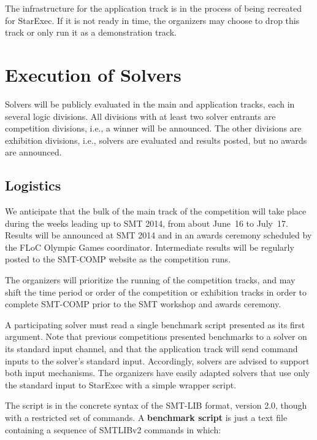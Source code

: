 \documentclass[12pt]{article}
\begin{document}
The infrastructure for the application track is in the process of being recreated for StarExec.
If it is not ready in time, the organizers may choose to drop this track or only run it as a demonstration track.

\section{Execution of Solvers}
\label{sec:exec}

Solvers will be publicly evaluated in the main and application tracks, each in several logic divisions. 
All divisions with at least two solver entrants are competition divisions, i.e., a winner will be announced. The other divisions are exhibition divisions, i.e., solvers are evaluated and results posted, but no awards are announced.

\subsection{Logistics}

%
We anticipate that the bulk of the main track of the competition will take place during
the weeks leading up to SMT 2014, from about June~16 to July~17.  Results will be
announced at SMT 2014 and in an awards ceremony scheduled by the FLoC Olympic Games coordinator.
  Intermediate results
will be regularly posted to the SMT-COMP website as the competition
runs.


The organizers will prioritize the running of the competition tracks, and may shift the
time period or order of the competition or exhibition tracks in order to complete SMT-COMP
prior to the SMT workshop and awards ceremony.

%
A participating solver must read a single benchmark script presented as its first argument.
Note that previous competitions presented benchmarks to a solver on its standard input
channel, and that the application track will send command inputs to the solver's standard input.
Accordingly, solvers are advised to support both input mechanisms. The organizers have easily adapted solvers that use only the standard input to StarExec with a simple wrapper script.

 The script is in the concrete syntax of the SMT-LIB format,
version 2.0, though with a restricted set of commands.   A
\textbf{benchmark script} is just a text file containing a sequence of SMTLIBv2 commands in which:
\end{document}
